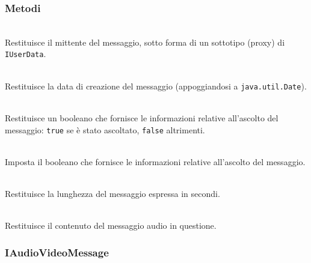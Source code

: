 \subsubsection*{Metodi}
\begin{description}
  \item{}\\
Restituisce il mittente del messaggio, sotto forma di un sottotipo (proxy) di \texttt{IUserData}.
  \item{}\\
Restituisce la data di creazione del messaggio (appoggiandosi a \texttt{java.util.Date}).
  \item{}\\
Restituisce un booleano che fornisce le informazioni relative all'ascolto del messaggio: \texttt{true} se è stato ascoltato, \texttt{false} altrimenti.
  \item{}\\
Imposta il booleano che fornisce le informazioni relative all'ascolto del messaggio.
  \item{}\\
Restituisce la lunghezza del messaggio espressa in secondi.
  \item{}\\
Restituisce il contenuto del messaggio audio in questione.
\end{description}

\subsubsection{IAudioVideoMessage}\label{sec:iaudiovideomessage}
